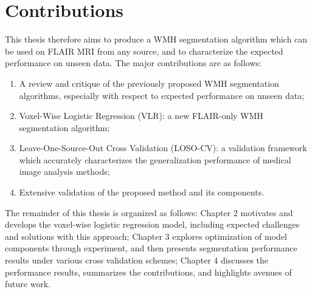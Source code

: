 \section{Contributions}
This thesis therefore aims to produce a WMH segmentation algorithm which can be used on FLAIR MRI from any source, and to characterize the expected performance on unseen data. The major contributions are as follows:
\begin{enumerate}
  \item A review and critique of the previously proposed WMH segmentation algorithms, especially with respect to expected performance on unseen data;
  \item Voxel-Wise Logistic Regression (VLR): a new FLAIR-only WMH segmentation algorithm;
  \item Leave-One-Source-Out Cross Validation (LOSO-CV): a validation framework which accurately characterizes the generalization performance of medical image analysis methods;
  \item Extensive validation of the proposed method and its components.
\end{enumerate}
The remainder of this thesis is organized as follows:
Chapter 2 motivates and develops the voxel-wise logistic regression model, including expected challenges and solutions with this approach;
Chapter 3 explores optimization of model components through experiment, and then presents segmentation performance results under various cross validation schemes;
Chapter 4 discusses the performance results, summarizes the contributions, and highlights avenues of future work.
